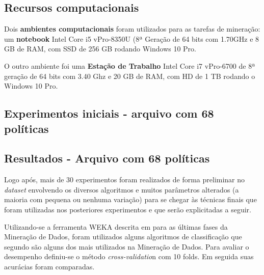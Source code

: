 \subsection{Recursos computacionais}
Dois \textbf{ambientes computacionais} foram utilizados para as tarefas de mineração: um \textbf{notebook}  Intel Core i5 vPro-8350U (8ª Geração de 64 bits com 1.70GHz e 8 GB de RAM, com SSD de 256 GB rodando Windows 10 Pro.

O outro ambiente foi uma \textbf{Estação de Trabalho} Intel Core i7 vPro-6700 de 8ª geração de 64 bits com 3.40 Ghz e 20 GB de RAM, com HD de 1 TB rodando o Windows 10 Pro.

\subsection{Experimentos iniciais - arquivo com 68 políticas}\label{exp:iniciais}




\subsection{Resultados - Arquivo com 68 políticas}
Logo após, mais de 30 experimentos foram realizados de forma preliminar no \textit{dataset} envolvendo os diversos algoritmos e muitos parâmetros alterados (a maioria com pequena ou nenhuma variação) para se chegar às técnicas finais que foram utilizadas nos posteriores experimentos e que serão explicitadas a seguir.

Utilizando-se a ferramenta WEKA descrita em \cite{eibe2016} para as últimas fases da Mineração de Dados, foram utilizados alguns algoritmos de classificação que segundo  são alguns dos mais utilizados na Mineração de Dados. Para avaliar o desempenho definiu-se o método \textit{cross-validatio}n com 10 folds. Em seguida suas acurácias foram comparadas.

